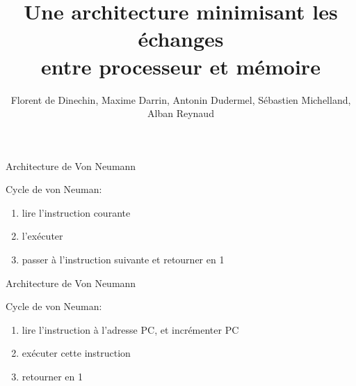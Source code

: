 \documentclass[slidetop,11pt,table]{beamer}
\title{Une architecture minimisant les échanges\\ entre processeur et mémoire}
\author{Florent de Dinechin, Maxime Darrin, Antonin Dudermel, Sébastien Michelland, Alban Reynaud}
\date{}
\begin{document}
\frame{\titlepage}


\begin{frame}{Architecture de Von Neumann}
  \begin{figure}[b]
    \begin{center}
    \end{center}
  \end{figure}
  Cycle de von Neuman:
  \begin{enumerate}
  \item lire l'instruction courante
  \item l'exécuter
  \item passer à l'instruction suivante et retourner en 1
  \end{enumerate}
\end{frame}


\begin{frame}{Architecture de Von Neumann}
  \begin{figure}[b]
    \begin{center}
    \end{center}
  \end{figure}
  Cycle de von Neuman:
  \begin{enumerate}
  \item lire l'instruction à l'adresse PC, et incrémenter PC
  \item exécuter cette instruction
    
  \item retourner en 1
  \end{enumerate}
\end{frame}
\end{document}

